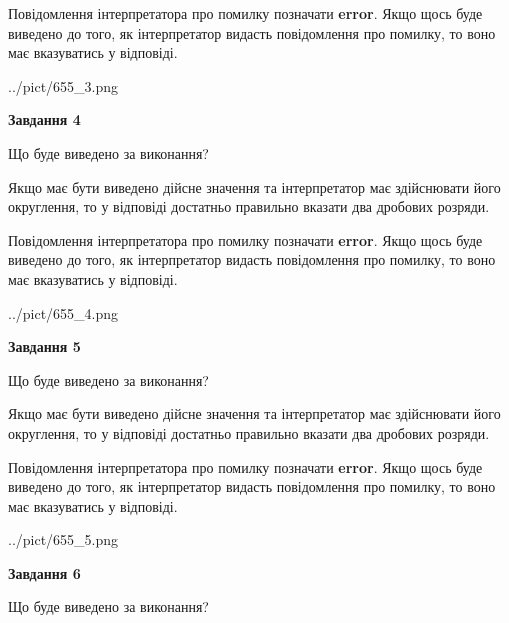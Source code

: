 \documentclass[12pt, ukrainian]{article}
\begin{document}
{\begin {Large}
Повідомлення інтерпретатора про помилку позначати \textbf{error}.
Якщо щось буде виведено до того, як інтерпретатор видасть повідомлення про помилку, 
то воно має вказуватись у відповіді. \par

\begin{center}
	{../pict/655_3.png}
\end{center}
\newpage

{\begin {center}\textbf{Завдання 4}\end {center}}\par
Що буде виведено за виконання? \par

Якщо має бути виведено дійсне значення та інтерпретатор має здійснювати його округлення, 
то у відповіді достатньо правильно вказати два дробових розряди.

Повідомлення інтерпретатора про помилку позначати \textbf{error}.
Якщо щось буде виведено до того, як інтерпретатор видасть повідомлення про помилку, 
то воно має вказуватись у відповіді. \par

\begin{center}
	{../pict/655_4.png}
\end{center}
\newpage

{\begin {center}\textbf{Завдання 5}\end {center}}\par
Що буде виведено за виконання? \par

Якщо має бути виведено дійсне значення та інтерпретатор має здійснювати його округлення, 
то у відповіді достатньо правильно вказати два дробових розряди.

Повідомлення інтерпретатора про помилку позначати \textbf{error}.
Якщо щось буде виведено до того, як інтерпретатор видасть повідомлення про помилку, 
то воно має вказуватись у відповіді. \par

\begin{center}
	{../pict/655_5.png}
\end{center}
\newpage

{\begin {center}\textbf{Завдання 6}\end {center}}\par
Що буде виведено за виконання? \par


\end{Large}}
\end{document}
